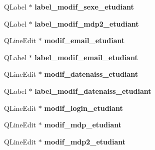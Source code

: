 \begin{DoxyCompactItemize}
\item 
\hypertarget{class_ui___administration_acc6e5a0869779a9683d9ca91ff24e559}{Q\+Label $\ast$ {\bfseries label\+\_\+modif\+\_\+sexe\+\_\+etudiant}}\label{class_ui___administration_acc6e5a0869779a9683d9ca91ff24e559}

\item 
\hypertarget{class_ui___administration_ae1dd4bf33f1b08a5fb671bee55e1f7ac}{Q\+Label $\ast$ {\bfseries label\+\_\+modif\+\_\+mdp2\+\_\+etudiant}}\label{class_ui___administration_ae1dd4bf33f1b08a5fb671bee55e1f7ac}

\item 
\hypertarget{class_ui___administration_aae3d00e48204c75d9d819d8c6cd5a5a9}{Q\+Line\+Edit $\ast$ {\bfseries modif\+\_\+email\+\_\+etudiant}}\label{class_ui___administration_aae3d00e48204c75d9d819d8c6cd5a5a9}

\item 
\hypertarget{class_ui___administration_a15904bd53170387093349392dc863b06}{Q\+Label $\ast$ {\bfseries label\+\_\+modif\+\_\+email\+\_\+etudiant}}\label{class_ui___administration_a15904bd53170387093349392dc863b06}

\item 
\hypertarget{class_ui___administration_adef07279067c1f16577b1401b56bdb2a}{Q\+Line\+Edit $\ast$ {\bfseries modif\+\_\+datenaiss\+\_\+etudiant}}\label{class_ui___administration_adef07279067c1f16577b1401b56bdb2a}

\item 
\hypertarget{class_ui___administration_ab675b85385ed799cbb4066dfecd01f74}{Q\+Label $\ast$ {\bfseries label\+\_\+modif\+\_\+datenaiss\+\_\+etudiant}}\label{class_ui___administration_ab675b85385ed799cbb4066dfecd01f74}

\item 
\hypertarget{class_ui___administration_a111f351a1c5f29cfddbf453fc555bb51}{Q\+Line\+Edit $\ast$ {\bfseries modif\+\_\+login\+\_\+etudiant}}\label{class_ui___administration_a111f351a1c5f29cfddbf453fc555bb51}

\item 
\hypertarget{class_ui___administration_a3956da483a5b28df7982c17b16661084}{Q\+Line\+Edit $\ast$ {\bfseries modif\+\_\+mdp\+\_\+etudiant}}\label{class_ui___administration_a3956da483a5b28df7982c17b16661084}

\item 
\hypertarget{class_ui___administration_a0aa352d083321118c47dfa6795161478}{Q\+Line\+Edit $\ast$ {\bfseries modif\+\_\+mdp2\+\_\+etudiant}}\label{class_ui___administration_a0aa352d083321118c47dfa6795161478}


\end{DoxyCompactItemize}
